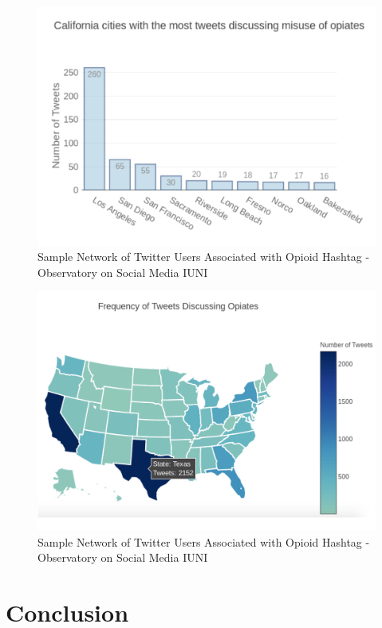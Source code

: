 \documentclass[sigconf]{acmart}
\begin{document}
\begin{figure}[!ht]
  \centering\includegraphics[width=\columnwidth]{images/Figure2.pdf}
  \caption{Sample Network of Twitter Users Associated with Opioid Hashtag - 
  Observatory on Social Media IUNI}
  \label{f:Figure2}
\end{figure}

\begin{figure}[!ht]
  \centering\includegraphics[width=\columnwidth]{images/Figure3.pdf}
  \caption{Sample Network of Twitter Users Associated with Opioid Hashtag - 
  Observatory on Social Media IUNI}
  \label{f:Figure3}
\end{figure}

\section{Conclusion}
\end{document}
